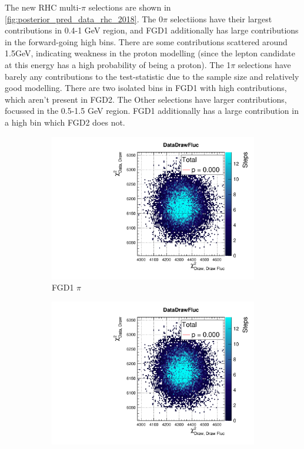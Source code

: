 The new RHC multi-$\pi$ selections are shown in \autoref{fig:posterior_pred_data_rhc_2018}. The 0$\pi$ selectiions have their largest contributions in 0.4-1 GeV region, and FGD1 additionally has large contributions in the forward-going high \pmu bins. There are some contributions scattered around 1.5GeV, indicating weakness in the proton modelling (since the lepton candidate at this energy has a high probability of being a proton). The 1$\pi$ selections have barely any contributions to the test-statistic due to the sample size and relatively good modelling. There are two isolated bins in FGD1 with high contributions, which aren't present in FGD2. The Other selections have larger contributions, focussed in the 0.5-1.5 GeV region. FGD1 additionally has a large contribution in a high \pmu bin which FGD2 does not. 
\begin{figure}[h]
	\begin{subfigure}[t]{0.32\textwidth}
		\includegraphics[width=\textwidth, trim={20mm 6mm 4mm 11mm}, clip,page=61]{figures/mach3/2018/data/2018a_FixedCov_RedCov_Mpi_Data_merge_PostPredStore_FullLLH_procs}
		\caption{FGD1 $\pi$}
	\end{subfigure}
	\begin{subfigure}[t]{0.32\textwidth}
		\includegraphics[width=\textwidth, trim={20mm 6mm 4mm 11mm}, clip,page=70]{figures/mach3/2018/data/2018a_FixedCov_RedCov_Mpi_Data_merge_PostPredStore_FullLLH_procs}

\end{subfigure}
\end{figure}
